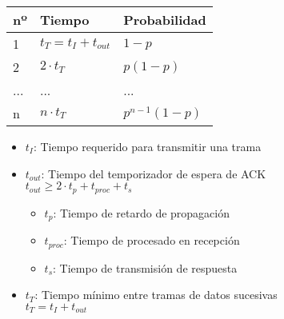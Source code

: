 \documentclass[9pt,landscape]{article}
\begin{document}
\begin{multicols}{3}
\begin{center}
\end{center}

\begin{center}
\begin{tabular}{|l|l|l|}

\hline
nº & Tiempo & Probabilidad \\ \hline
1  &    $t_{T} = t_{I} + t_{out}$    &        $1 - p$      \\ \hline
2  & $2 \cdot t_{T} $        &   $p(1 - p)$          \\ \hline
...   &    ...    &     ...        \\ \hline
n  &    $n \cdot t_{T}$    &      $p^{n-1} (1-p) $       \\ \hline
\end{tabular}
\end{center}


	\begin{itemize}
		\item $t_{I}$: Tiempo requerido para transmitir una trama
		\item $t_{out}$: Tiempo del temporizador de espera de ACK\\
			\qquad $t_{out} \geq 2 \cdot t_{p} + t_{proc} + t_{s}$
			
			\begin{itemize}
				\item $t_{p}$: Tiempo de retardo de propagación
				\item $t_{proc}$: Tiempo de procesado en recepción
				\item $t_{s}$: Tiempo de transmisión de respuesta
			\end{itemize}
		\item $t_{T}$: Tiempo mínimo entre tramas de datos sucesivas \\
			\qquad $t_{T} = t_{I} + t_{out}$
	\end{itemize}


\end{multicols}
\end{document}
